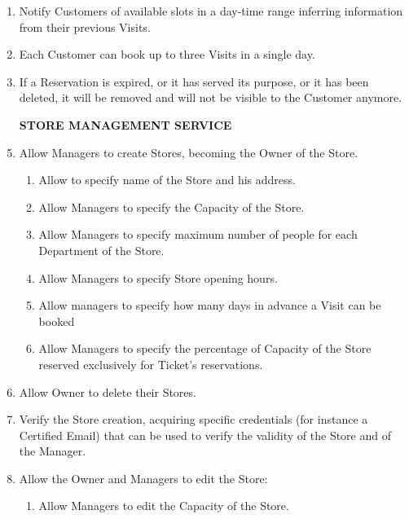 \documentclass[a4paper, 12pt, oneside]{article}
\begin{document}
\begin{enumerate}[align=left, label={R.\arabic{*}}]
    \item \label{req:notifyCustomerOpenSlots}Notify Customers of available slots in a day-time range inferring information from their previous Visits.
    \item \label{req:visitPerDay} Each Customer can book up to three Visits in a single day.
    \item \label{req:expiredTickOrVis} If a Reservation is expired, or it has served its purpose, or it has been deleted, it will be removed and will not be visible to the Customer anymore.
    
    \item[\textbf{STORE MANAGEMENT SERVICE}]
    \item \label{req:man:createStore}Allow Managers to create Stores, becoming the Owner of the Store.
    \begin{enumerate}[label={-}]
        \item \label{req:man:createStore:nameAndLoc}Allow to specify name of the Store and his address.
         \item \label{req:man:createStore:maxPeople}Allow Managers to specify the Capacity of the Store.
        \item \label{req:man:createStore:maxPeoplePerDep}Allow Managers to specify maximum number of people for each Department of the Store.
        \item \label{req:man:createStore:openingHours}Allow Managers to specify Store opening hours.
        \item \label{req:man:createStore:daysToBook}Allow managers to specify how many days in advance a Visit can be booked
        \item \label{req:man:createStore:percentageTicket} Allow Managers to specify the percentage of Capacity of the Store reserved exclusively for Ticket's reservations.
    \end{enumerate}
    \item \label{req:man:deleteStore}Allow Owner to delete their Stores.
    \item \label{req:man:verifyOwnerCred}Verify the Store creation, acquiring specific credentials (for instance a Certified Email) that can be used to verify the validity of the Store and of the Manager.
    \item \label{req:man:updateStoreInfo}Allow the Owner and Managers to edit the Store:
    \begin{enumerate}[label={-}]
         \item \label{req:man:updateStoreInfo:maxPeople}Allow Managers to edit the Capacity of the Store.

\end{enumerate}
\end{enumerate}
\end{document}
